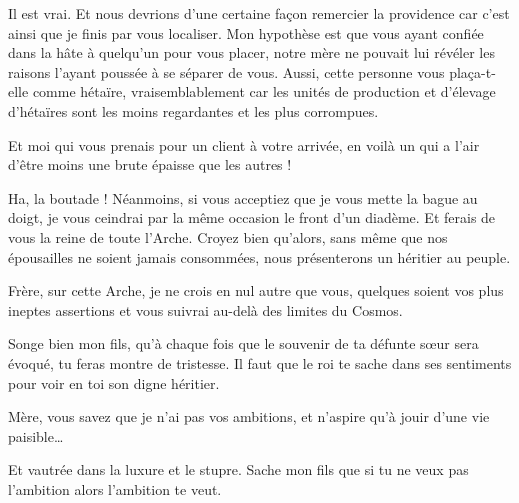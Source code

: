 \begin{drama}
   \elenaspeaks Il est vrai. Et nous devrions d’une certaine façon remercier la providence car c’est ainsi que je finis par vous localiser. Mon hypothèse est que vous ayant confiée dans la hâte à quelqu’un pour vous placer, notre mère ne pouvait lui révéler les raisons l’ayant poussée à se séparer de vous. Aussi, cette personne vous plaça-t-elle comme hétaïre, vraisemblablement car les unités de production et d’élevage d’hétaïres sont les moins regardantes et les plus corrompues.

   \elaspeaks {} Et moi qui vous prenais pour un client à votre arrivée, en voilà un qui a l’air d’être moins une brute épaisse que les autres !

   \elenaspeaks Ha, la boutade ! %
   Néanmoins,
   si vous acceptiez que je vous mette la bague au doigt, je vous ceindrai par la même occasion le front d’un diadème. Et ferais de vous la reine de toute l’Arche. Croyez bien qu’alors, sans même que nos épousailles ne soient jamais consommées, nous présenterons un héritier au peuple.%

   \elaspeaks Frère, sur cette Arche, je ne crois en nul autre que vous, quelques soient vos plus ineptes assertions et vous suivrai au-delà des limites du Cosmos.
\end{drama}


\scene

\StageDirII{\reine, \vladimir}



\begin{drama}

  \reinespeaks Songe bien mon fils, qu’à chaque fois que le souvenir de ta défunte sœur sera évoqué, tu feras montre de tristesse. Il faut que le roi te sache dans ses sentiments pour voir en toi son digne héritier.%

  \vladimirspeaks Mère, vous savez que je n’ai pas vos ambitions, et n’aspire qu’à jouir d’une vie paisible…

  \reinespeaks Et vautrée dans la luxure et le stupre. Sache mon fils que si tu ne veux pas l’ambition alors l’ambition te veut.
\end{drama}

